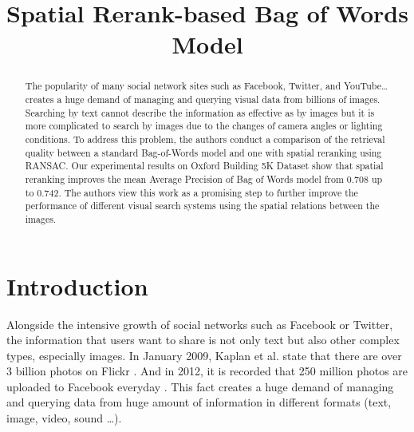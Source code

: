 \documentclass[10pt,conference,]{IEEEtran}
\begin{document}
\title{Spatial Rerank-based Bag of Words Model}

\author{
\and
{}
}

\maketitle


\begin{abstract}
The popularity of many social network sites such as Facebook, Twitter, and YouTube… creates a huge demand of managing and querying visual data from billions of images. Searching by text cannot describe the information as effective as by images but it is more complicated to search by images due to the changes of camera angles or lighting conditions. To address this problem, the authors conduct a comparison of the retrieval quality between a standard Bag-of-Words model and one with spatial reranking using RANSAC. Our experimental results on Oxford Building 5K Dataset show that spatial reranking improves the mean Average Precision of Bag of Words model from 0.708 up to 0.742. The authors view this work as a promising step to further improve the performance of different visual search systems using the spatial relations between the images.
\end{abstract}

\IEEEpeerreviewmaketitle

\section{Introduction} \label{section:introduction}
Alongside the intensive growth of social networks such as Facebook or Twitter, the information that users want to share is not only text but also other complex types, especially images. In January 2009, Kaplan et al. state that there are over 3 billion photos on Flickr \cite{Kaplan201059}. And in 2012, it is recorded that 250 million photos are uploaded to Facebook everyday \cite{1}. This fact creates a huge demand of managing and querying data from huge amount of information in different formats (text, image, video, sound \ldots).
\end{document}
